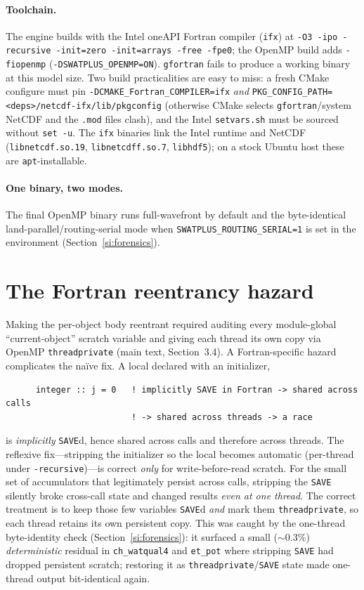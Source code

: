 \documentclass[12pt]{article}
\begin{document}
\paragraph{Toolchain.} The engine builds with the Intel oneAPI Fortran compiler (\texttt{ifx}) at
\texttt{-O3 -ipo -recursive -init=zero -init=arrays -free -fpe0}; the OpenMP build adds
\texttt{-fiopenmp} (\texttt{-DSWATPLUS\_OPENMP=ON}). \texttt{gfortran} fails to produce a working
binary at this model size. Two build practicalities are easy to miss: a fresh CMake configure must
pin \texttt{-DCMAKE\_Fortran\_COMPILER=ifx} \emph{and}
\texttt{PKG\_CONFIG\_PATH=<deps>/netcdf-ifx/lib/pkgconfig} (otherwise CMake selects
\texttt{gfortran}/system NetCDF and the \texttt{.mod} files clash), and the Intel \texttt{setvars.sh}
must be sourced without \texttt{set -u}. The \texttt{ifx} binaries link the Intel runtime and
NetCDF (\texttt{libnetcdf.so.19}, \texttt{libnetcdff.so.7}, \texttt{libhdf5}); on a stock Ubuntu
host these are \texttt{apt}-installable.

\paragraph{One binary, two modes.} The final OpenMP binary runs full-wavefront by default and the
byte-identical land-parallel/routing-serial mode when \texttt{SWATPLUS\_ROUTING\_SERIAL=1} is set
in the environment (Section~\ref{si:forensics}).

\section{The Fortran reentrancy hazard}\label{si:reentrancy}
Making the per-object body reentrant required auditing every module-global ``current-object''
scratch variable and giving each thread its own copy via OpenMP \texttt{threadprivate} (main text, Section~3.4). A Fortran-specific hazard complicates the na\"ive fix. A local declared with an
initializer,
\begin{verbatim}
      integer :: j = 0   ! implicitly SAVE in Fortran -> shared across calls
                         ! -> shared across threads -> a race
\end{verbatim}
is \emph{implicitly} \texttt{SAVE}d, hence shared across calls and therefore across threads. The
reflexive fix---stripping the initializer so the local becomes automatic (per-thread under
\texttt{-recursive})---is correct \emph{only} for write-before-read scratch. For the small set of
accumulators that legitimately persist across calls, stripping the \texttt{SAVE} silently broke
cross-call state and changed results \emph{even at one thread}. The correct treatment is to keep
those few variables \texttt{SAVE}d \emph{and} mark them \texttt{threadprivate}, so each thread
retains its own persistent copy. This was caught by the one-thread byte-identity check
(Section~\ref{si:forensics}): it surfaced a small ($\sim$0.3\%) \emph{deterministic} residual in
\texttt{ch\_watqual4} and \texttt{et\_pot} where stripping \texttt{SAVE} had dropped persistent
scratch; restoring it as \texttt{threadprivate}/\texttt{SAVE} state made one-thread output
bit-identical again.
\end{document}
